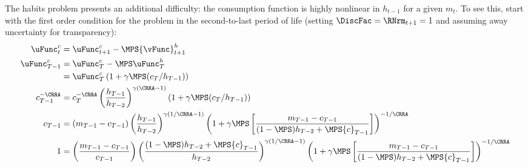 \documentclass[titlepage, headings=optiontotocandhead]{\econtex}
\begin{document}
{  The habits problem presents an additional difficulty: the consumption
  function is highly nonlinear in $h_{t-1}$ for a given ${m}_{t}$.   To
  see this, start with the first order condition for the problem in the
  second-to-last period of life (setting $\DiscFac = \RNrm_{t+1} = 1$ and assuming
  away uncertainty for transparency):
  \begin{equation}\begin{gathered}\begin{aligned}
        \uFunc_{t}^{c}    & = \uFunc_{t+1}^{c} - \MPS {\vFunc}_{t+1}^{h}
        \\      \uFunc_{T-1}^{c}  & = \uFunc_{T}^{c} - \MPS \uFunc_{T}^{h}
        \\   & =  \uFunc_{T}^{c}\left(1 + \gamma \MPS
          ({c}_{T}/h_{T-1})\right)
        \\      {c}_{T-1}^{-\CRRA} 
        & =                                      {c}_{T}^{-\CRRA}\left(\frac{h_{T-1}}{h_{T-2}}\right)^{\gamma(\CRRA-1)}\left(1 + \gamma \MPS
          ({c}_{T}/h_{T-1})\right)  \\
        {c}_{T-1} 
        & =                     ({m}_{T-1}-{c}_{T-1})\left(\frac{h_{T-1}}{h_{T-2}}\right)^{\gamma(1/\CRRA-1)}\left(1 +
          \gamma \MPS \left[\frac{{m}_{T-1}-{c}_{T-1}}{(1-\MPS)h_{T-2}+\MPS
              {c}_{T-1}}\right]\right)^{-1/\CRRA}
        \\      1 
        & =                     \left(\frac{{m}_{T-1}-{c}_{T-1}}{{c}_{T-1}}\right)\left(\frac{(1-\MPS)h_{T-2}+\MPS {c}_{T-1}}{h_{T-2}}\right)^{\gamma(1/\CRRA-1)}\left(1 +
          \gamma \MPS \left[\frac{{m}_{T-1}-{c}_{T-1}}{(1-\MPS)h_{T-2}+\MPS
              {c}_{T-1}}\right]\right)^{-1/\CRRA} \nonumber
        \\ \label{eq:oneeq}
      \end{aligned}\end{gathered}\end{equation}

}
\end{document}
